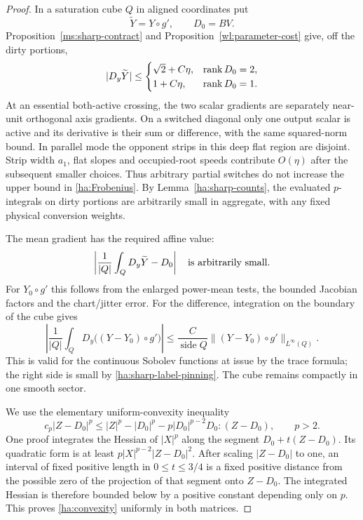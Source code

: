 \begin{proof}
In a saturation cube $Q$ in aligned coordinates put
\[
                  \widetilde Y=Y\circ g',\qquad D_0=BV.
\]
Proposition~\ref{ms:sharp-contract} and
Proposition~\ref{wl:parameter-cost} give, off the dirty portions,
\begin{equation}\label{ha:Frobenius}
 |D_y\widetilde Y|\le
 \begin{cases}
   \sqrt2+C\eta,&\operatorname{rank} D_0=2,\\
   1+C\eta,&\operatorname{rank} D_0=1.
 \end{cases}
\end{equation}
At an essential both-active crossing, the two scalar gradients
are separately near-unit orthogonal axis gradients.  On a switched
diagonal only one output scalar is active and its derivative is
their sum or difference, with the same squared-norm bound.  In
parallel mode the opponent strips in this deep flat region are
disjoint.  Strip width $a_1$, flat slopes and occupied-root speeds
contribute $O(\eta)$ after the subsequent smaller choices.  Thus
arbitrary partial switches do not increase the upper bound in
\eqref{ha:Frobenius}.  By Lemma~\ref{ha:sharp-counts}, the evaluated
$p$-integrals on dirty portions are arbitrarily small in aggregate,
with any fixed physical conversion weights.

The mean gradient has the required affine value:
\begin{equation}\label{ha:mean-gradient}
                \left|\frac{1}{|Q|}\int_Q D_y\widetilde Y-D_0\right|
                      \quad\hbox{is arbitrarily small}.
\end{equation}
For $Y_0\circ g'$ this follows from the enlarged power-mean tests,
the bounded Jacobian factors and the chart/jitter error.  For the
difference, integration on the boundary of the cube gives
\[
 \left|\frac{1}{|Q|}\int_Q D_y\bigl((Y-Y_0)\circ g'\bigr)\right|
       \le \frac{C}{\operatorname{side}Q}
                       \|(Y-Y_0)\circ g'\|_{L^\infty(Q)}.
\]
This is valid for the continuous Sobolev functions at issue by
the trace formula; the right side is small by
\eqref{ha:sharp-label-pinning}.  The cube remains compactly in one
smooth sector.

We use the elementary uniform-convexity inequality
\begin{equation}\label{ha:convexity}
 c_p|Z-D_0|^p\le |Z|^p-|D_0|^p
             -p|D_0|^{p-2}D_0:(Z-D_0),\qquad p>2.
\end{equation}
One proof integrates the Hessian of $|X|^p$ along the segment
$D_0+t(Z-D_0)$.  Its quadratic form is at least
$p|X|^{p-2}|Z-D_0|^2$.  After scaling $|Z-D_0|$ to one, an interval
of fixed positive length in $0\le t\le3/4$ is a fixed positive
distance from the possible zero of the projection of that segment
onto $Z-D_0$.  The integrated Hessian is therefore bounded below
by a positive constant depending only on $p$.  This proves
\eqref{ha:convexity} uniformly in both matrices.


\end{proof}
